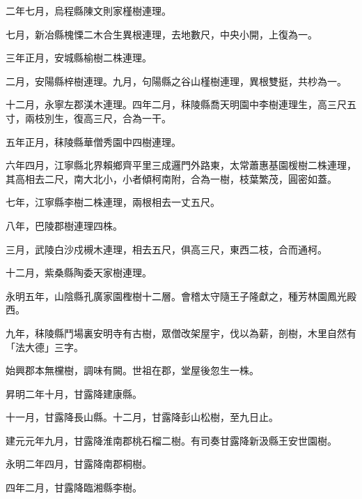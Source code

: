 \begin{pinyinscope}
 二年七月，烏程縣陳文則家槿樹連理。



 七月，新冶縣槐慄二木合生異根連理，去地數尺，中央小開，上復為一。



 三年正月，安城縣榆樹二株連理。



 二月，安陽縣梓樹連理。九月，句陽縣之谷山槿樹連理，異根雙挺，共杪為一。



 十二月，永寧左郡渼木連理。四年二月，秣陵縣喬天明園中李樹連理生，高三尺五寸，兩枝別生，復高三尺，合為一干。



 五年正月，秣陵縣華僧秀園中四樹連理。



 六年四月，江寧縣北界賴鄉齊平里三成邏門外路東，太常蕭惠基園楥樹二株連理，其高相去二尺，南大北小，小者傾柯南附，合為一樹，枝葉繁茂，圓密如蓋。



 七年，江寧縣李樹二株連理，兩根相去一丈五尺。



 八年，巴陵郡樹連理四株。



 三月，武陵白沙戍槻木連理，相去五尺，俱高三尺，東西二枝，合而通柯。



 十二月，紫桑縣陶委天家樹連理。



 永明五年，山陰縣孔廣家園檉樹十二層。會稽太守隨王子隆獻之，種芳林園鳳光殿西。



 九年，秣陵縣鬥場裏安明寺有古樹，眾僧改架屋宇，伐以為薪，剖樹，木里自然有「法大德」三字。



 始興郡本無欓樹，調味有闕。世祖在郡，堂屋後忽生一株。



 昇明二年十月，甘露降建康縣。



 十一月，甘露降長山縣。十二月，甘露降彭山松樹，至九日止。



 建元元年九月，甘露降淮南郡桃石榴二樹。有司奏甘露降新汲縣王安世園樹。



 永明二年四月，甘露降南郡桐樹。



 四年二月，甘露降臨湘縣李樹。




\end{pinyinscope}
